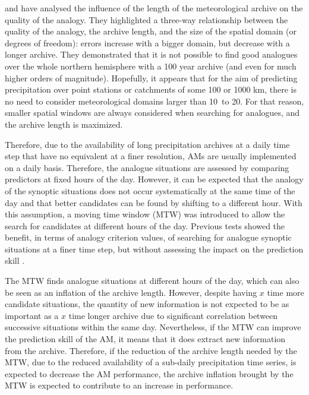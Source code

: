 \documentclass[hess, manuscript]{copernicus}
\begin{document}
	\citet{Ruosteenoja1988} and \citet{Vandendool1994} have analysed the influence of the length of the meteorological archive on the quality of the analogy. They highlighted a three-way relationship between the quality of the analogy, the archive length, and the size of the spatial domain (or degrees of freedom): errors increase with a bigger domain, but decrease with a longer archive. They demonstrated that it is not possible to find good analogues over the whole northern hemisphere with a 100 year archive (and even for much higher orders of magnitude). Hopefully, it appears that for the aim of predicting precipitation over point stations or catchments of some 100 or 1000 km\texttwosuperior, there is no need to consider meteorological domains larger than 10\textdegree\ to 20\textdegree. For that reason, smaller spatial windows are always considered when searching for analogues, and the archive length is maximized. 
	
	Therefore, due to the availability of long precipitation archives at a daily time step that have no equivalent at a finer resolution, AMs are usually implemented on a daily basis. Therefore, the analogue situations are assessed by comparing predictors at fixed hours of the day. However, it can be expected that the analogy of the synoptic situations does not occur systematically at the same time of the day and that better candidates can be found by shifting to a different hour. With this assumption, a moving time window (MTW) was introduced to allow the search for candidates at different hours of the day. Previous tests showed the benefit, in terms of analogy criterion values, of searching for analogue synoptic situations at a finer time step, but without assessing the impact on the prediction skill \citep{Finet2008}.
	
	The MTW finds analogue situations at different hours of the day, which can also be seen as an inflation of the archive length. However, despite having $x$ time more candidate situations, the quantity of new information is not expected to be as important as a $x$ time longer archive due to significant correlation between successive situations within the same day. Nevertheless, if the MTW can improve the prediction skill of the AM, it means that it does extract new information from the archive. Therefore, if the reduction of the archive length needed by the MTW, due to the reduced availability of a sub-daily precipitation time series, is expected to decrease the AM performance, the archive inflation brought by the MTW is expected to contribute to an increase in performance.
	
\end{document}
